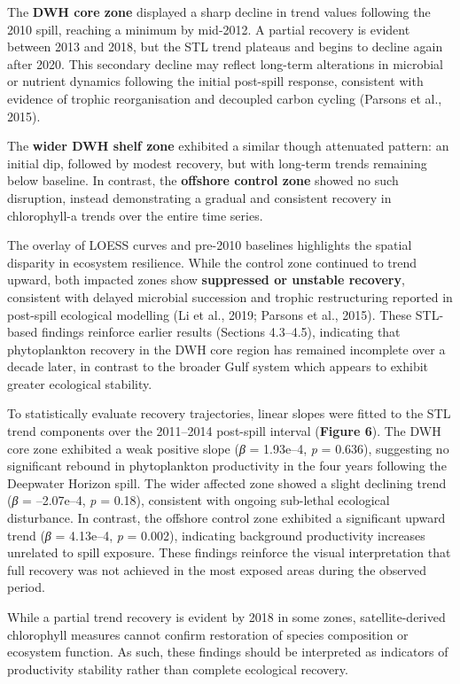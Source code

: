 \documentclass[
  11pt,
]{article}
\begin{document}
The \textbf{DWH core zone} displayed a sharp decline in trend values
following the 2010 spill, reaching a minimum by mid-2012. A partial
recovery is evident between 2013 and 2018, but the STL trend plateaus
and begins to decline again after 2020. This secondary decline may
reflect long-term alterations in microbial or nutrient dynamics
following the initial post-spill response, consistent with evidence of
trophic reorganisation and decoupled carbon cycling (Parsons et al.,
2015).

The \textbf{wider DWH shelf zone} exhibited a similar though attenuated
pattern: an initial dip, followed by modest recovery, but with long-term
trends remaining below baseline. In contrast, the \textbf{offshore
control zone} showed no such disruption, instead demonstrating a gradual
and consistent recovery in chlorophyll-a trends over the entire time
series.

The overlay of LOESS curves and pre-2010 baselines highlights the
spatial disparity in ecosystem resilience. While the control zone
continued to trend upward, both impacted zones show \textbf{suppressed
or unstable recovery}, consistent with delayed microbial succession and
trophic restructuring reported in post-spill ecological modelling (Li et
al., 2019; Parsons et al., 2015). These STL-based findings reinforce
earlier results (Sections 4.3--4.5), indicating that phytoplankton
recovery in the DWH core region has remained incomplete over a decade
later, in contrast to the broader Gulf system which appears to exhibit
greater ecological stability.

To statistically evaluate recovery trajectories, linear slopes were
fitted to the STL trend components over the 2011--2014 post-spill
interval (\textbf{Figure 6}). The DWH core zone exhibited a weak
positive slope (\emph{β} = 1.93e--4, \emph{p} = 0.636), suggesting no
significant rebound in phytoplankton productivity in the four years
following the Deepwater Horizon spill. The wider affected zone showed a
slight declining trend (\emph{β} = --2.07e--4, \emph{p} = 0.18),
consistent with ongoing sub-lethal ecological disturbance. In contrast,
the offshore control zone exhibited a significant upward trend (\emph{β}
= 4.13e--4, \emph{p} = 0.002), indicating background productivity
increases unrelated to spill exposure. These findings reinforce the
visual interpretation that full recovery was not achieved in the most
exposed areas during the observed period.

While a partial trend recovery is evident by 2018 in some zones,
satellite-derived chlorophyll measures cannot confirm restoration of
species composition or ecosystem function. As such, these findings
should be interpreted as indicators of productivity stability rather
than complete ecological recovery.
\end{document}
